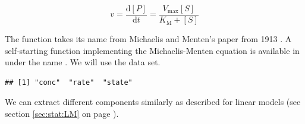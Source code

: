 \documentclass[krantz2]{krantz}\usepackage{knitr}
\begin{document}
\begin{equation}\label{eq:michaelis:menten}
v = \frac{\mathrm{d} [P]}{\mathrm{d} t} = \frac{V_{\mathrm{max}} [S]}{K_{\mathrm{M}} + [S]}
\end{equation}

The function takes its name from Michaelis and Menten's paper from 1913 \autocite{Johnson2011}. A self-starting function implementing the Michaelis-Menten equation is available in \Rlang under the name . We will use the  data set.

\begin{knitrout}\footnotesize
{}\color{fgcolor}\begin{kframe}
\begin{alltt}
\end{alltt}
\begin{verbatim}
## [1] "conc"  "rate"  "state"
\end{verbatim}
\end{kframe}
\end{knitrout}

\begin{knitrout}\footnotesize
{}\color{fgcolor}\begin{kframe}
\begin{alltt}
 \hlkwb{<-}  \hlopt{~}   
              \hlopt{==} \hlstd{)}
\end{alltt}
\end{kframe}
\end{knitrout}

We can extract different components similarly as described for linear models (see section \ref{sec:stat:LM} on page \pageref{sec:stat:LM}).
\end{document}
